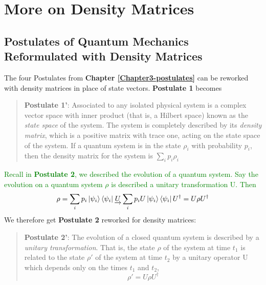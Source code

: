 
\chapter{More on Density Matrices} %

\label{AppendixB} %
\section{Postulates of Quantum Mechanics Reformulated with Density Matrices}



The four Postulates from \textbf{Chapter \ref{Chapter3-postulates}} can be reworked with density matrices in place of state vectors. \textbf{Postulate 1} becomes
\begin{quote}
\textbf{Postulate 1'}: Associated to any isolated physical system is a complex vector space with inner product (that is, a Hilbert space) known as the \textit{state space} of the system. The system is completely described by its \textit{density matrix}, which is a positive matrix with trace one, acting on the state space of the system. If a quantum system is in the state $\rho_i$ with probability $p_i$, then the density matrix for the system is $\sum_i p_i \rho_i$    
\end{quote}

\textcolor{green}{Recall in \textbf{Postulate 2}, we described the evolution of a quantum system. Say the evolution on a quantum system $\rho$ is described a unitary transformation U. Then}
    \begin{equation}
        \rho=\sum_i p_i \ket{\psi_i}\bra{\psi_i}	\underrightarrow{U}\sum_i p_i U \ket{\psi_i}\bra{\psi_i}U^\dagger=U \rho U^\dagger
    \end{equation}
We therefore get \textbf{Postulate 2} reworked for density matrices:  
\begin{quote}
    {\bf{Postulate 2'}}: The evolution of a closed quantum system is described by a \textit{unitary transformation}. That is, the state $\rho$ of the system at time $t_1$ is related to the state $\rho'$ of the system at time $t_2$ by a unitary operator U which depends only on the times $t_1$ and $t_2$,
    \begin{equation} \label{eqn: density matrix postulate 2}
    \rho'=U\rho U^\dagger        
    \end{equation}
\end{quote}


